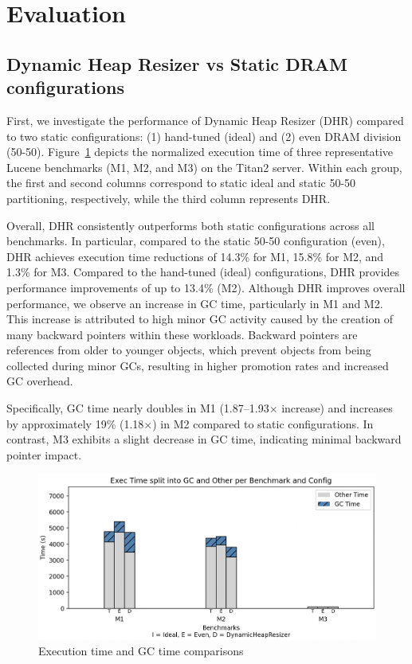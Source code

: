 \section{Evaluation}
\subsection{Dynamic Heap Resizer vs Static DRAM configurations}
First, we investigate the performance of Dynamic Heap Resizer 
(DHR) compared to two static configurations: (1) hand-tuned 
(ideal) and (2) even DRAM division (50-50). 
Figure~\ref{fig:gc_exec_time} depicts the normalized 
execution time of three representative Lucene benchmarks 
(M1, M2, and M3) on the Titan2 server. Within each group,
the first and second columns correspond to static ideal and 
static 50-50 partitioning, respectively, while the third
column represents DHR.

Overall, DHR consistently outperforms both static
configurations across all benchmarks. In particular,
compared to the static 50-50 configuration (even), DHR
achieves execution time reductions of 14.3\% for M1, 15.8\% 
for M2, and 1.3\% for M3. Compared to the hand-tuned (ideal)
configurations, DHR provides performance improvements of 
up to 13.4\% (M2). 
Although DHR improves overall performance, we observe an increase 
in GC time, particularly in M1 and M2. This increase is attributed
to high minor GC activity caused by the creation of many backward 
pointers within these workloads. Backward pointers are references 
from older to younger objects, which prevent objects from being 
collected during minor GCs, resulting in higher promotion rates and
increased GC overhead.

Specifically, GC time nearly doubles in M1 (1.87–1.93× increase) and
increases by approximately 19\% (1.18×) in M2 compared to static configurations. 
In contrast, M3 exhibits a slight decrease in GC time, indicating minimal backward 
pointer impact.


\begin{figure}[htbp]
  \centering
  \includegraphics[width=1\columnwidth]{fig/eval_graph.png}
  \caption{Execution time and GC time comparisons}
  \label{fig:gc_exec_time}
\end{figure}

